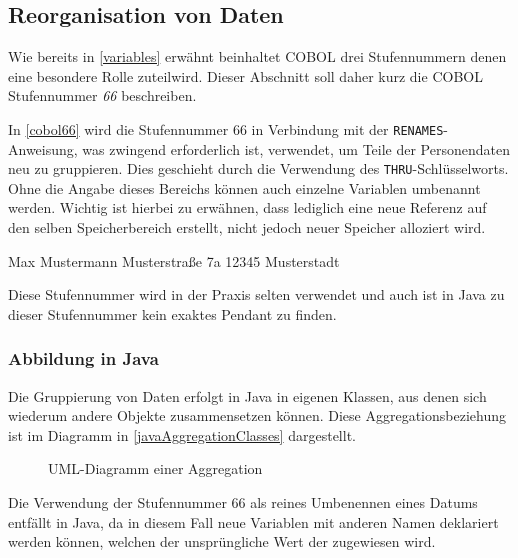 \subsection{Reorganisation von Daten}
Wie bereits in \autoref{variables} erwähnt beinhaltet COBOL drei Stufennummern denen eine besondere Rolle zuteilwird. Dieser Abschnitt soll daher kurz die COBOL Stufennummer \textit{66} beschreiben.

In \autoref{cobol66} wird die Stufennummer 66 in Verbindung mit der \texttt{RENAMES}-Anweisung, was zwingend erforderlich ist, verwendet, um Teile der Personendaten neu zu gruppieren. Dies geschieht durch die Verwendung des \texttt{THRU}-Schlüsselworts. Ohne die Angabe dieses Bereichs können auch einzelne Variablen umbenannt werden. Wichtig ist hierbei zu erwähnen, dass lediglich eine neue Referenz auf den selben Speicherbereich erstellt, nicht jedoch neuer Speicher alloziert wird.
\begin{shellwindow}
Max       Mustermann
Musterstraße  7a   12345 Musterstadt   
\end{shellwindow}
Diese Stufennummer wird in der Praxis selten verwendet und auch ist in Java zu dieser Stufennummer kein exaktes Pendant zu finden. 
\subsubsection*{Abbildung in Java}
Die Gruppierung von Daten erfolgt in Java in eigenen Klassen, aus denen sich wiederum andere Objekte zusammensetzen können. Diese Aggregationsbeziehung ist im Diagramm in \autoref{javaAggregationClasses} dargestellt. 

\begin{figure}[H]
    \centering
    \caption{UML-Diagramm einer Aggregation}
    \label{javaAggregationClasses}
\end{figure}
Die Verwendung der Stufennummer 66 als reines Umbenennen eines Datums entfällt in Java, da in diesem Fall neue Variablen mit anderen Namen deklariert werden können, welchen der unsprüngliche Wert der zugewiesen wird.
